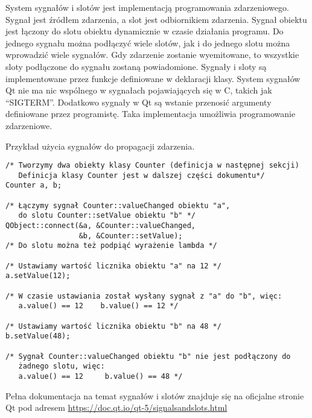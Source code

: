 
\par
System sygnałów i slotów jest implementacją programowania zdarzeniowego.
Sygnał jest źródłem zdarzenia, a slot jest odbiornikiem zdarzenia.
Sygnał obiektu jest łączony do slotu obiektu dynamicznie w czasie działania programu.
Do jednego sygnału można podłączyć wiele slotów, jak i do jednego slotu można wprowadzić wiele sygnałów.
Gdy zdarzenie zostanie wyemitowane, to wszystkie sloty podłączone do sygnału zostaną powiadomione.
Sygnały i sloty są implementowane przez funkcje definiowane w deklaracji klasy.
System sygnałów Qt nie ma nic wspólnego w sygnałach pojawiających się w C, takich jak \enquote{SIGTERM}.
Dodatkowo sygnały w Qt są wstanie przenosić argumenty definiowane przez programistę.
Taka implementacja umożliwia programowanie zdarzeniowe.

\par
Przykład użycia sygnałów do propagacji zdarzenia.

\begin{lstlisting}
/* Tworzymy dwa obiekty klasy Counter (definicja w następnej sekcji) 
   Definicja klasy Counter jest w dalszej części dokumentu*/
Counter a, b;

/* Łączymy sygnał Counter::valueChanged obiektu "a",
   do slotu Counter::setValue obiektu "b" */
QObject::connect(&a, &Counter::valueChanged,
                 &b, &Counter::setValue);
/* Do slotu można też podpiąć wyrażenie lambda */

/* Ustawiamy wartość licznika obiektu "a" na 12 */
a.setValue(12);

/* W czasie ustawiania został wysłany sygnał z "a" do "b", więc:
   a.value() == 12    b.value() == 12 */

/* Ustawiamy wartość licznika obiektu "b" na 48 */
b.setValue(48);

/* Sygnał Counter::valueChanged obiektu "b" nie jest podłączony do
   żadnego slotu, więc:
   a.value() == 12     b.value() == 48 */

\end{lstlisting}

\par
Pełna dokumentacja na temat sygnałów i slotów znajduje się na oficjalne stronie Qt pod adresem \url{https://doc.qt.io/qt-5/signalsandslots.html}